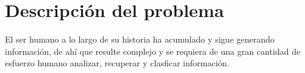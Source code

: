\section{Descripci\'on del problema}



El ser humano a lo largo de su historia ha acumulado y sigue generando informaci\'on, de ah\'i que resulte complejo y se requiera de una gran cantidad de esfuerzo humano analizar, recuperar y clasficar informaci\'on.



